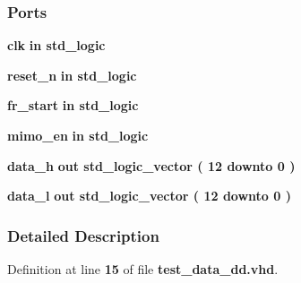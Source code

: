 \subsubsection*{Ports}
 \begin{DoxyCompactItemize}
\item 
{\bf clk}  {\bfseries {\bfseries \textcolor{keywordflow}{in}\textcolor{vhdlchar}{ }}} {\bfseries \textcolor{comment}{std\+\_\+logic}\textcolor{vhdlchar}{ }} 
\item 
{\bf reset\+\_\+n}  {\bfseries {\bfseries \textcolor{keywordflow}{in}\textcolor{vhdlchar}{ }}} {\bfseries \textcolor{comment}{std\+\_\+logic}\textcolor{vhdlchar}{ }} 
\item 
{\bf fr\+\_\+start}  {\bfseries {\bfseries \textcolor{keywordflow}{in}\textcolor{vhdlchar}{ }}} {\bfseries \textcolor{comment}{std\+\_\+logic}\textcolor{vhdlchar}{ }} 
\item 
{\bf mimo\+\_\+en}  {\bfseries {\bfseries \textcolor{keywordflow}{in}\textcolor{vhdlchar}{ }}} {\bfseries \textcolor{comment}{std\+\_\+logic}\textcolor{vhdlchar}{ }} 
\item 
{\bf data\+\_\+h}  {\bfseries {\bfseries \textcolor{keywordflow}{out}\textcolor{vhdlchar}{ }}} {\bfseries \textcolor{comment}{std\+\_\+logic\+\_\+vector}\textcolor{vhdlchar}{ }\textcolor{vhdlchar}{(}\textcolor{vhdlchar}{ }\textcolor{vhdlchar}{ } \textcolor{vhdldigit}{12} \textcolor{vhdlchar}{ }\textcolor{keywordflow}{downto}\textcolor{vhdlchar}{ }\textcolor{vhdlchar}{ } \textcolor{vhdldigit}{0} \textcolor{vhdlchar}{ }\textcolor{vhdlchar}{)}\textcolor{vhdlchar}{ }} 
\item 
{\bf data\+\_\+l}  {\bfseries {\bfseries \textcolor{keywordflow}{out}\textcolor{vhdlchar}{ }}} {\bfseries \textcolor{comment}{std\+\_\+logic\+\_\+vector}\textcolor{vhdlchar}{ }\textcolor{vhdlchar}{(}\textcolor{vhdlchar}{ }\textcolor{vhdlchar}{ } \textcolor{vhdldigit}{12} \textcolor{vhdlchar}{ }\textcolor{keywordflow}{downto}\textcolor{vhdlchar}{ }\textcolor{vhdlchar}{ } \textcolor{vhdldigit}{0} \textcolor{vhdlchar}{ }\textcolor{vhdlchar}{)}\textcolor{vhdlchar}{ }} 
\end{DoxyCompactItemize}


\subsubsection{Detailed Description}


Definition at line {\bf 15} of file {\bf test\+\_\+data\+\_\+dd.\+vhd}.



